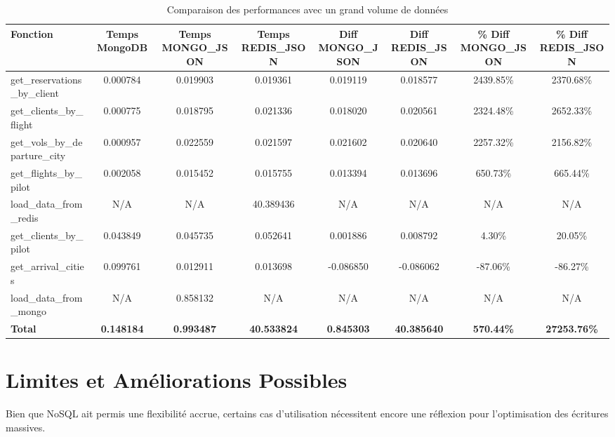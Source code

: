\begin{table}[htbp]
  \centering
  \caption{Comparaison des performances avec un grand volume de données}
  \label{tab:performance2}
  \begin{adjustbox}{width=\textwidth}
  \begin{tabular}{lccccccc}
  \toprule
  \textbf{Fonction} & \textbf{Temps MongoDB} & \textbf{Temps MONGO\_JSON} & \textbf{Temps REDIS\_JSON} & \textbf{Diff MONGO\_JSON} & \textbf{Diff REDIS\_JSON} & \textbf{\% Diff MONGO\_JSON} & \textbf{\% Diff REDIS\_JSON} \\
  \midrule
  get\_reservations\_by\_client & 0.000784 & 0.019903 & 0.019361 & 0.019119 & 0.018577 & 2439.85\% & 2370.68\% \\
  get\_clients\_by\_flight      & 0.000775 & 0.018795 & 0.021336 & 0.018020 & 0.020561 & 2324.48\% & 2652.33\% \\
  get\_vols\_by\_departure\_city & 0.000957 & 0.022559 & 0.021597 & 0.021602 & 0.020640 & 2257.32\% & 2156.82\% \\
  get\_flights\_by\_pilot       & 0.002058 & 0.015452 & 0.015755 & 0.013394 & 0.013696 & 650.73\%  & 665.44\%  \\
  load\_data\_from\_redis       & N/A      & N/A      & 40.389436 & N/A       & N/A       & N/A       & N/A       \\
  get\_clients\_by\_pilot       & 0.043849 & 0.045735 & 0.052641 & 0.001886 & 0.008792 & 4.30\%    & 20.05\%   \\
  get\_arrival\_cities          & 0.099761 & 0.012911 & 0.013698 & -0.086850 & -0.086062 & -87.06\%  & -86.27\%  \\
  load\_data\_from\_mongo       & N/A      & 0.858132 & N/A       & N/A       & N/A       & N/A       & N/A       \\
  \midrule
  \textbf{Total}                & \textbf{0.148184} & \textbf{0.993487} & \textbf{40.533824} & \textbf{0.845303} & \textbf{40.385640} & \textbf{570.44\%} & \textbf{27253.76\%} \\
  \bottomrule
  \end{tabular}
  \end{adjustbox}
\end{table}


\section{Limites et Améliorations Possibles}
Bien que NoSQL ait permis une flexibilité accrue, certains cas d'utilisation nécessitent encore une réflexion pour l'optimisation des écritures massives.
